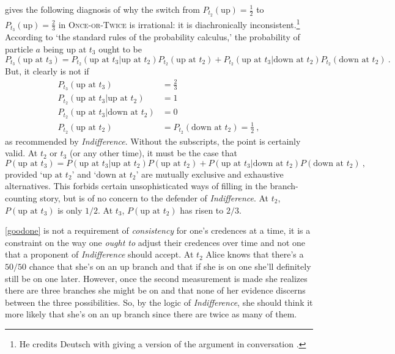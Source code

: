 \documentclass[12pt,onecolumn,secnumarabic,amsmath,amssymb,balancelastpage,nofootinbib]{article}
\begin{document}
\citet[]{wallace2012} gives the following diagnosis of why the switch from $P_{t_2}(\text{up})=\frac{1}{2}$ to $P_{t_3}(\text{up})=\frac{2}{3}$ in \textsc{Once-or-Twice} is irrational: it is diachronically inconsistent.\footnote{He credits Deutsch with giving a version of the argument in conversation \citep[][footnote 15]{wallace2013}.}  According to `the standard rules of the probability calculus,' the probability of particle $a$ being up at $t_3$ ought to be
\begin{equation}
P_{t_3}(\text{up at }t_3)=P_{t_2}(\text{up at }t_3|\text{up at }t_2)P_{t_2}(\text{up at }t_2)+P_{t_2}(\text{up at }t_3|\text{down at }t_2)P_{t_2}(\text{down at }t_2) \ .
\label{goodone}
\end{equation}
But, it clearly is not if
\begin{align}
P_{t_3}(\text{up at }t_3)&= \frac{2}{3}
\nonumber
\\
P_{t_2}(\text{up at }t_3|\text{up at }t_2)&= 1
\nonumber
\\
P_{t_2}(\text{up at }t_3|\text{down at }t_2)&= 0
\nonumber
\\
P_{t_2}(\text{up at }t_2)&= P_{t_2}(\text{down at }t_2)=\frac{1}{2}\ ,
\label{probs}
\end{align}
as recommended by \emph{Indifference}.  Without the subscripts, the point is certainly valid.  At $t_2$ or $t_3$ (or any other time), it must be the case that
\begin{equation}
P(\text{up at }t_3)=P(\text{up at }t_3|\text{up at }t_2)P(\text{up at }t_2)+P(\text{up at }t_3|\text{down at }t_2)P(\text{down at }t_2) \ ,
\end{equation}
provided `$\text{up at }t_2$' and `$\text{down at }t_2$' are mutually exclusive and exhaustive alternatives.  This forbids certain unsophisticated ways of filling in the branch-counting story, but is of no concern to the defender of \emph{Indifference}.  At $t_2$, $P(\text{up at }t_3)$ is only $1/2$. At $t_3$, $P(\text{up at }t_2)$ has risen to $2/3$.

\eqref{goodone} is not a requirement of \emph{consistency} for one's credences at a time, it is a constraint on the way one \emph{ought to} adjust their credences over time and not one that a proponent of \emph{Indifference} should accept.  At $t_2$ Alice knows that there's a $50/50$ chance that she's on an up branch and that if she is on one she'll definitely still be on one later.  However, once the second measurement is made she realizes there are three branches she might be on and that none of her evidence discerns between the three possibilities.  So, by the logic of \emph{Indifference}, she should think it more likely that she's on an up branch since there are twice as many of them.
\end{document}
